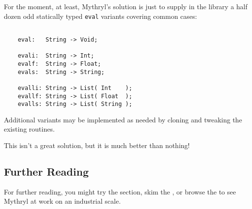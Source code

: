 For the moment, at least, Mythryl's solution is just to supply in the 
library a half dozen odd statically typed {\tt eval} variants covering 
common cases:

\begin{verbatim}

    eval:   String -> Void;

    evali:  String -> Int;
    evalf:  String -> Float;
    evals:  String -> String;

    evalli: String -> List( Int    );
    evallf: String -> List( Float  );
    evalls: String -> List( String );

\end{verbatim}

Additional variants may be implemented as needed by 
cloning and tweaking the existing routines.

This isn't a great solution, but it is much better than nothing!

\cutend*

\subsection{Further Reading}

For further reading, you might try the 
 section, 
skim the , 
or browse the  to see 
Mythryl at work on an industrial scale.

\cutend*
